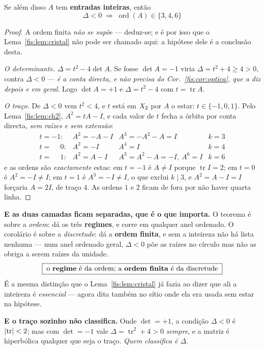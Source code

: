 \documentclass[livro.tex]{subfiles}
\begin{document}
\begin{corolario}\label{fis:cor:ordem}
Se além disso $A$ tem \textbf{entradas inteiras}, então
\[
\boxed{\;\Delta<0\;\Longrightarrow\;\operatorname{ord}(A)\in\{3,4,6\}\;}
\]
\end{corolario}

\begin{proof}
A ordem finita \emph{não se supõe} --- deduz-se; e é por isso que o
Lema~\ref{fis:lem:cristal} não pode ser chamado aqui: a hipótese dele é a
conclusão desta.

\emph{O determinante.} $\Delta=t^{2}-4\det A$. Se fosse $\det A=-1$ viria
$\Delta=t^{2}+4\ge4>0$, contra $\Delta<0$ --- \emph{é a conta directa, e não
precisa do Cor.~\ref{fis:cor:optica}, que a diz depois e em geral}. Logo $\det A=+1$ e $\Delta=t^{2}-4$
com $t=\operatorname{tr}A$.

\emph{O traço.} De $\Delta<0$ vem $t^{2}<4$, e $t$ está em $X_2$ por $A$ o estar:
$t\in\{-1,0,1\}$. Pelo Lema~\ref{fis:lem:ch2}, $A^{2}=tA-I$, e cada valor de $t$
fecha a órbita por conta directa, \emph{sem raízes e sem extensão}:
\[
\begin{array}{clll}
t=-1: & A^{2}=-A-I & A^{3}=-A^{2}-A=I & k=3\\
t=\phantom{-}0: & A^{2}=-I & A^{4}=I & k=4\\
t=\phantom{-}1: & A^{2}=A-I & A^{3}=A^{2}-A=-I,\ A^{6}=I & k=6
\end{array}
\]
e as ordens são \emph{exactamente} estas: em $t=-1$ é $A\neq I$ porque
$\operatorname{tr}I=2$; em $t=0$ é $A^{2}=-I\neq I$; em $t=1$ é $A^{3}=-I\neq I$,
o que exclui $k\mid3$, e $A^{2}=A-I=I$ forçaria $A=2I$, de traço $4$. As ordens
$1$ e $2$ ficam de fora por não haver quarta linha.
\end{proof}
\medskip\noindent\textbf{E as duas camadas ficam separadas, que é o que importa.}
O teorema é sobre a \emph{ordem}: dá os três \textbf{regimes}, e corre em qualquer
anel ordenado. O corolário é sobre a \emph{discretude}: dá a \textbf{ordem
finita}, e sem a inteireza não há lista nenhuma --- num anel ordenado geral,
$\Delta<0$ põe as raízes no círculo mas não as obriga a serem raízes da unidade.
\[
\boxed{\;\text{o \textbf{regime} é da ordem; a \textbf{ordem finita} é da discretude}\;}
\]
É a mesma distinção que o Lema~\ref{fis:lem:cristal} já fazia ao dizer que ali a
inteireza é \emph{essencial} --- agora dita também no sítio onde ela era usada
sem estar na hipótese.

\medskip\noindent\textbf{E o traço sozinho não classifica.} Onde $\det=+1$, a
condição $\Delta<0$ é $\lvert \operatorname{tr}\rvert<2$; mas com $\det=-1$ vale
$\Delta=\operatorname{tr}^{2}+4>0$ \emph{sempre}, e a matriz é hiperbólica
qualquer que seja o traço. \emph{Quem classifica é $\Delta$.}
\end{document}

